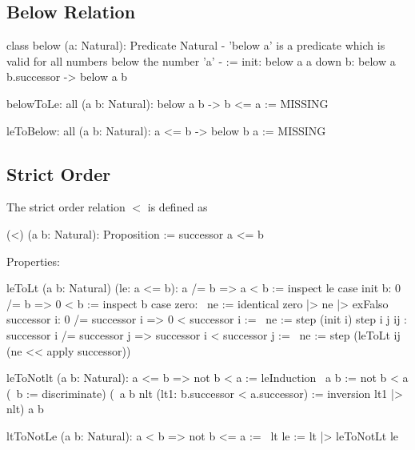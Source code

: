 \subsection{Below Relation}

\begin{alba}
    class
        below (a: Natural): Predicate Natural
            {- 'below a' is a predicate which is valid for all numbers
                below the number 'a' -}
    :=
        init: below a a
        down b: below a b.successor -> below a b

    belowToLe: all (a b: Natural): below a b -> b <= a :=
        MISSING

    leToBelow: all (a b: Natural): a <= b -> below b a :=
        MISSING
\end{alba}









\subsection{Strict Order}

\noindent The strict order relation $<$ is defined as

\begin{alba}
  (<) (a b: Natural): Proposition :=
    successor a <= b
\end{alba}

Properties:

\begin{alba}
    leToLt (a b: Natural) (le: a <= b): a /= b => a < b :=
        inspect le case
            init b: 0 /= b => 0 < b :=
                inspect b case
                    zero: \ ne := identical zero |> ne |> exFalso
                    successor i: 0 /= successor i => 0 < successor i :=
                        \ ne := step (init i)
            step i j ij
            : successor i /= successor j => successor i < successor j :=
                \ ne :=
                    step (leToLt ij (ne << apply successor))
\end{alba}


\begin{alba}
    leToNotlt (a b: Natural): a <= b => not b < a :=
        leInduction
            {\ a b := not b < a}
            (\ b := discriminate)
            (\ a b nlt (lt1: b.successor < a.successor) :=
                inversion lt1 |> nlt)
            a
            b

    ltToNotLe (a b: Natural): a < b => not b <= a :=
        \ lt le :=
            lt |> leToNotLt le
\end{alba}










